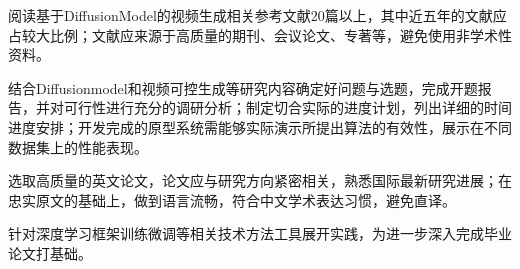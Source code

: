 \cleardoublepage
{}
{
    \setlength{\parindent}{0em}
    \hspace{2em} 阅读基于DiffusionModel的视频生成相关参考文献20篇以上，其中近五年的文献应占较大比例；文献应来源于高质量的期刊、会议论文、专著等，避免使用非学术性资料。
    
    \hspace{2em} 结合Diffusionmodel和视频可控生成等研究内容确定好问题与选题，完成开题报告，并对可行性进行充分的调研分析；制定切合实际的进度计划，列出详细的时间进度安排；开发完成的原型系统需能够实际演示所提出算法的有效性，展示在不同数据集上的性能表现。

    \hspace{2em} 选取高质量的英文论文，论文应与研究方向紧密相关，熟悉国际最新研究进展；在忠实原文的基础上，做到语言流畅，符合中文学术表达习惯，避免直译。

    \hspace{2em} 针对深度学习框架训练微调等相关技术方法工具展开实践，为进一步深入完成毕业论文打基础。

    }

\mbox{} \vfill



